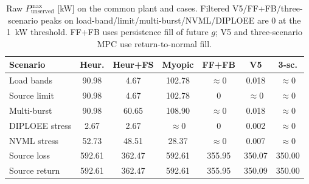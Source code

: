 \documentclass{ieeeaccess}
\begin{document}
\begin{table}[!t]
\centering
\caption{Raw $P_{\mathrm{unserved}}^{\max}$ [kW] on the common plant and cases. Filtered V5/FF+FB/three-scenario peaks on load-band/limit/multi-burst/NVML/DIPLOEE are 0 at the \SI{1}{\kilo\watt} threshold. FF+FB uses persistence fill of future $g$; V5 and three-scenario MPC use return-to-normal fill.}
\label{tab:punserved}
{\footnotesize\setlength{\tabcolsep}{3.2pt}%
\begin{tabular}{@{}lcccccc@{}}
\toprule
Scenario & Heur. & Heur+FS & Myopic & FF+FB & V5 & 3-sc. \\
\midrule
Load bands & 90.98 & 4.67 & 102.78 & $\approx 0$ & 0.018 & $\approx 0$ \\
Source limit & 90.98 & 4.67 & 102.78 & $0$ & $\approx 0$ & $\approx 0$ \\
Multi-burst & 90.98 & 60.65 & 108.90 & $\approx 0$ & 0.018 & $\approx 0$ \\
DIPLOEE stress & 2.67 & 2.67 & $\approx 0$ & $0$ & 0.002 & $\approx 0$ \\
NVML stress & 52.73 & 48.51 & 28.37 & $\approx 0$ & 0.007 & $\approx 0$ \\
Source loss & 592.61 & 362.47 & 592.61 & 355.95 & 350.07 & 350.00 \\
Source return & 592.61 & 362.47 & 592.61 & 355.95 & 350.09 & 350.00 \\
\bottomrule
\end{tabular}}
\end{table}
\end{document}
